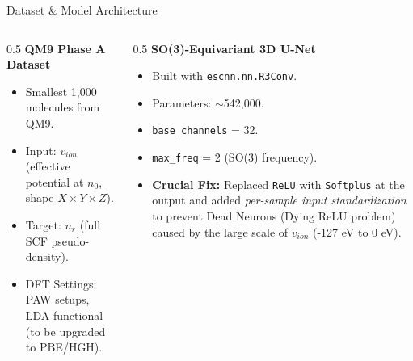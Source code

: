 \documentclass[aspectratio=169]{beamer}
\begin{document}
\begin{frame}{Dataset \& Model Architecture}
  \begin{columns}
    \begin{column}{0.5\textwidth}
      \textbf{QM9 Phase A Dataset}
      \begin{itemize}
          \item Smallest 1,000 molecules from QM9.
          \item Input: $v_{ion}$ (effective potential at $n_0$, shape $X \times Y \times Z$).
          \item Target: $n_r$ (full SCF pseudo-density).
          \item DFT Settings: PAW setups, LDA functional (to be upgraded to PBE/HGH).
      \end{itemize}
    \end{column}
    \begin{column}{0.5\textwidth}
      \textbf{SO(3)-Equivariant 3D U-Net}
      \begin{itemize}
          \item Built with \texttt{escnn.nn.R3Conv}.
          \item Parameters: $\sim$542,000.
          \item \texttt{base\_channels} = 32.
          \item \texttt{max\_freq} = 2 (SO(3) frequency).
          \item \textbf{Crucial Fix:} Replaced \texttt{ReLU} with \texttt{Softplus} at the output and added \textit{per-sample input standardization} to prevent Dead Neurons (Dying ReLU problem) caused by the large scale of $v_{ion}$ (-127 eV to 0 eV).
      \end{itemize}
    \end{column}
  \end{columns}
\end{frame}
\end{document}
